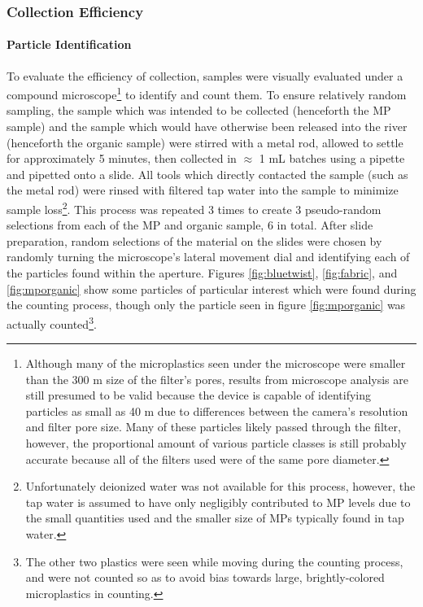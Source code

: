 \documentclass[fleqn,10pt]{SelfArx} %
\begin{document}
	\subsubsection{Collection Efficiency}
	\paragraph{Particle Identification}
	To evaluate the efficiency of collection, samples were visually evaluated under a compound microscope\footnote{Although many of the microplastics seen under the microscope were smaller than the 300 \textmu m size of the filter's pores, results from microscope analysis are still presumed to be valid because the device is capable of identifying particles as small as 40 \textmu m due to differences between the camera's resolution and filter pore size. Many of these particles likely passed through the filter, however, the proportional amount of various particle classes is still probably accurate because all of the filters used were of the same pore diameter.} to identify and count them. To ensure relatively random sampling, the sample which was intended to be collected (henceforth the MP sample) and the sample which would have otherwise been released into the river (henceforth the organic sample) were stirred with a metal rod, allowed to settle for approximately 5 minutes, then collected in $\approx$ 1 mL batches using a pipette and pipetted onto a slide. All tools which directly contacted the sample (such as the metal rod) were rinsed with filtered tap water into the sample to minimize sample loss\footnote{Unfortunately deionized water was not available for this process, however, the tap water is assumed to have only negligibly contributed to MP levels due to the small quantities used and the smaller size of MPs typically found in tap water.}. This process was repeated 3 times to create 3 pseudo-random selections from each of the MP and organic sample, 6 in total. After slide preparation, random selections of the material on the slides were chosen by randomly turning the microscope's lateral movement dial and identifying each of the particles found within the aperture. 
	Figures \ref{fig:bluetwist}, \ref{fig:fabric}, and \ref{fig:mporganic} show some particles of particular interest which were found during the counting process, though only the particle seen in figure \ref{fig:mporganic} was actually counted\footnote{The other two plastics were seen while moving during the counting process, and were not counted so as to avoid bias towards large, brightly-colored microplastics in counting.}.
	
\end{document}
